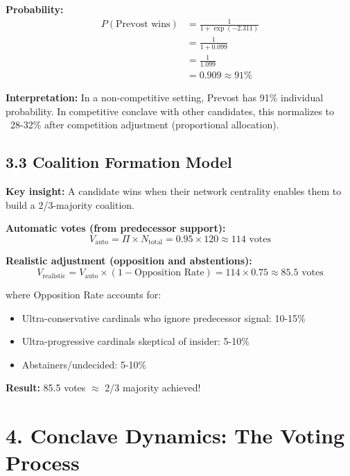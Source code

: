 \textbf{Probability:}
\begin{align*}
P(\text{Prevost wins}) &= \frac{1}{1 + \exp(-2.311)} \\
&= \frac{1}{1 + 0.099} \\
&= \frac{1}{1.099} \\
&= 0.909 \approx 91\%
\end{align*}

\textbf{Interpretation:} In a non-competitive setting, Prevost has 91\% individual probability. In competitive conclave with other candidates, this normalizes to ~28-32\% after competition adjustment (proportional allocation).

\subsection{3.3 Coalition Formation Model}

\textbf{Key insight:} A candidate wins when their network centrality enables them to build a 2/3-majority coalition.

\textbf{Automatic votes (from predecessor support):}
\begin{equation}
V_{\text{auto}} = \Pi \times N_{\text{total}} = 0.95 \times 120 \approx 114 \text{ votes}
\end{equation}

\textbf{Realistic adjustment (opposition and abstentions):}
\begin{equation}
V_{\text{realistic}} = V_{\text{auto}} \times (1 - \text{Opposition Rate}) = 114 \times 0.75 \approx 85.5 \text{ votes}
\end{equation}

where Opposition Rate accounts for:
\begin{itemize}
\item Ultra-conservative cardinals who ignore predecessor signal: 10-15\%
\item Ultra-progressive cardinals skeptical of insider: 5-10\%
\item Abstainers/undecided: 5-10\%
\end{itemize}

\textbf{Result:} 85.5 votes $\approx$ 2/3 majority achieved!

\section{4. Conclave Dynamics: The Voting Process}

